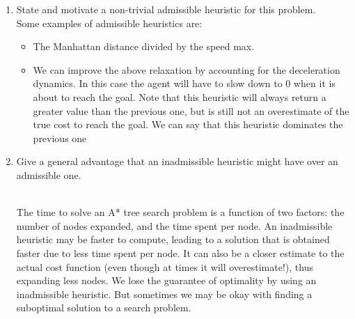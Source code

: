 \documentclass[9pt,a4paper]{extarticle}
\newenvironment{solution}
    {%
    \color{red}
    }
    { 
    \color{black}
    }
\begin{document}
\begin{itemize}
    \begin{enumerate}
        \item State and motivate a non-trivial admissible heuristic for this problem.
        \begin{solution}\\
        Some examples of admissible heuristics are:
        \begin{itemize}
            \item The Manhattan distance divided by the speed max.
            \item We can improve the above relaxation by accounting for the deceleration dynamics. In this case the
agent will have to slow down to 0 when it is about to reach the goal. Note that this heuristic will
always return a greater value than the previous one, but is still not an overestimate of the true cost
to reach the goal. We can say that this heuristic dominates the previous one
        \end{itemize}
        \end{solution}
        \item Give a general advantage that an inadmissible heuristic might have over an admissible one.
        \begin{solution}
        \\
        The time to solve an A* tree search problem is a function of two factors: the number of nodes expanded,
and the time spent per node.
An inadmissible heuristic may be faster to compute, leading to a solution that is obtained faster due to
less time spent per node. It can also be a closer estimate to the actual cost function (even though at times
it will overestimate!), thus expanding less nodes.
We lose the guarantee of optimality by using an inadmissible heuristic. But sometimes we may be okay
with finding a suboptimal solution to a search problem.
        \end{solution}
    \end{enumerate}
\end{itemize}
\end{document}
